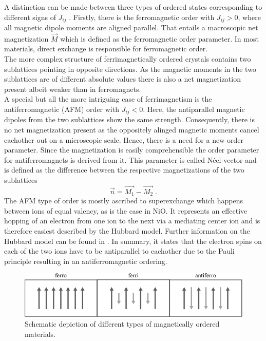 A distinction can be made between three types of ordered states corresponding to different signs of $J_{ij}$ \cite{stohr_magnetism_2006}.
Firstly, there is the ferromagnetic order with $J_{ij}>0$, where all magnetic dipole moments are aligned parallel.
That entails a macroscopic net magnetization $\vec{M}$ which is defined as the ferromagnetic order parameter.
In most materials, direct exchange is responsible for ferromagnetic order. \\
The more complex structure of ferrimagnetically ordered crystals contains two sublattices pointing in opposite directions.
As the magnetic moments in the two sublattices are of different absolute values there is also a net magnetization present albeit weaker than in ferromagnets. \\
A special but all the more intriguing case of ferrimagnetism is the antiferromagnetic (AFM) order with $J_{ij}<0$.
Here, the antiparallel magnetic dipoles from the two sublattices show the same strength.
Consequently, there is no net magnetization present as the oppositely alinged magnetic moments cancel eachother out on a microscopic scale.
Hence, there is a need for a new order parameter.
Since the magnetization is easily comprehensible
the order parameter for antiferromagnets is derived from it.
This parameter is called Néel-vector and is defined as the difference between the respective magnetizations of the two sublattices \cite{stohr_magnetism_2006}
\begin{equation}
    \vec{n} = \vec{M_1} - \vec{M_2} \;.
\end{equation}
The AFM type of order is mostly ascribed to superexchange which happens between ions of equal valency, as is the case in NiO.
It represents an effective hopping of an electron from one ion to the next via a mediating center ion and is therefore easiest described by the Hubbard model.
Further information on the Hubbard model can be found in \cite{hubbard_j_electron_1963}\cite{streltsov_orbital_2017}.
In summary, it states that the electron spins on each of the two ions have to be antiparallel to eachother due to the Pauli principle resulting in an antiferromagnetic ordering.
\begin{figure}[ht]
    \centering
    \includegraphics[width=\textwidth]{pictures/magnetic_order.pdf}
    \caption{Schematic depiction of different types of magnetically ordered materials.}
    \label{fig:magnetic_order}
\end{figure}
